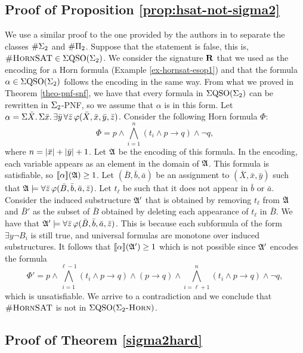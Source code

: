 \subsection*{Proof of Proposition \ref{prop:hsat-not-sigma2}} %
We use a similar proof to the one provided by the authors in \cite{SalujaST95} to separate the classes $\#\Sigma_{2}$ and $\#\Pi_{2}$. Suppose that the statement is false, this is, $\textsc{\#HornSAT} \in \Sigma{\rm QSO}(\Sigma_{2})$. We consider the signature $\mathbf{R}$ that we used as the encoding for a Horn formula (Example \ref{ex-hornsat-esop1}) and that the formula $\alpha \in \Sigma{\rm QSO}(\Sigma_{2})$ follows the encoding in the same way. From what we proved in Theorem \ref{theo-pnf-snf}, we have that every formula in $\Sigma{\rm QSO}(\Sigma_{2})$ can be rewritten in $\Sigma_{2}$-PNF, so we assume that $\alpha$ is in this form. Let $\alpha = \Sigma{\bar{X}}.\,\Sigma{\bar{x}}.\,\exists\bar{y}\,\forall\bar{z}\,\varphi(\bar{X},\bar{x},\bar{y},\bar{z})$. Consider the following Horn formula $\Phi$:
$$
\Phi = p \wedge \bigwedge_{i = 1}^n (t_i \wedge p \to q) \wedge \neg q,
$$
where $n = \vert \bar{x} \vert + \vert \bar{y} \vert + 1$. Let $\mathfrak{A}$ be the encoding of this formula. In the encoding, each variable appears as an element in the domain of $\mathfrak{A}$. This formula is satisfiable, so ${\llbracket{}{\alpha}\rrbracket}(\mathfrak{A}) \geq 1$. Let $(\bar{B},\bar{b},\bar{a})$ be an assignment to $(\bar{X},\bar{x},\bar{y})$ such that $\mathfrak{A}\models\forall\bar{z}\,\varphi(\bar{B},\bar{b},\bar{a},\bar{z})$. Let $t_{\ell}$ be such that it does not appear in $\bar{b}$ or $\bar{a}$. Consider the induced substructure $\mathfrak{A}'$ that is obtained by removing $t_{\ell}$ from $\mathfrak{A}$ and $\bar{B}'$ as the subset of $\bar{B}$ obtained by deleting each appearance of $t_{\ell}$ in $\bar{B}$. We have that $\mathfrak{A}'\models\forall\bar{z}\,\varphi(\bar{B},\bar{b},\bar{a},\bar{z})$. This is because each subformula of the form $\exists y \neg B_i$ is still true, and universal formulas are monotone over induced substructures. It follows that ${\llbracket{}{\alpha}\rrbracket}(\mathfrak{A}') \geq 1$ which is not possible since $\mathfrak{A}'$ encodes the formula
$$
\Phi' = p \wedge \bigwedge_{i = 1}^{\ell-1} (t_i \wedge p \to q) \wedge (p\to q) \wedge \bigwedge_{i = \ell+1}^{n} (t_i \wedge p \to q) \wedge \neg q,
$$
which is unsatisfiable. We arrive to a contradiction and we conclude that $\textsc{\#HornSAT}$ is not in $\Sigma{\rm QSO}(\Sigma_2\textsc{-Horn})$.








\subsection*{Proof of Theorem \ref{sigma2hard}} %

